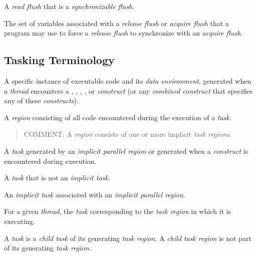 \glossarydefstart
A \emph{read flush} that is a \emph{synchronizable flush}.
\glossarydefend

\glossarydefstart
The set of variables associated with a \emph{release flush} or \emph{acquire flush} that a
program may use to force a \emph{release flush} to synchronize with an \emph{acquire flush}.
\glossarydefend





\subsection{Tasking Terminology}
\label{subsec:Tasking Terminology}
\glossarydefstart
A specific instance of executable code and its \emph{data environment}, generated when a 
\emph{thread} encounters a , , , , or
 \emph{construct} (or any \emph{combined construct} that specifies
any of these \emph{constructs}).
\glossarydefend

\glossarydefstart
A \emph{region} consisting of all code encountered during the execution of a \emph{task}. 

\begin{quote}
COMMENT: A  \emph{region} consists of one or more implicit \emph{task regions}. 
\end{quote}
\glossarydefend

\glossarydefstart
A \emph{task} generated by an \emph{implicit parallel region} or generated when a 
\emph{construct} is encountered during execution.
\glossarydefend

\glossarydefstart
A \emph{task} that is not an \emph{implicit task}.
\glossarydefend

\glossarydefstart
An \emph{implicit task} associated with an \emph{implicit parallel region}.
\glossarydefend

\glossarydefstart
For a given \emph{thread}, the \emph{task} corresponding to the \emph{task region} in which it is 
executing.
\glossarydefend

\glossarydefstart
A \emph{task} is a \emph{child task} of its generating \emph{task region}. 
A \emph{child task region} is not part of its generating \emph{task region}.
\glossarydefend

